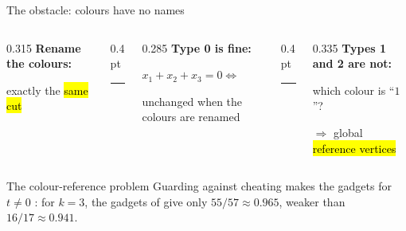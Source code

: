 \begin{frame}{The obstacle: colours have no names}
\vspace{3mm}
\begin{columns}[T,onlytextwidth]
\begin{column}{0.315\textwidth}
\textbf{Rename the colours:}\par\vspace{3.4mm}
\centerline{}\par\vspace{2.6mm}
\centerline{exactly the \hl{same cut}}
\end{column}
\begin{column}{0.4pt}\color{acc!25}\rule{0.4pt}{37mm}\end{column}
\begin{column}{0.285\textwidth}
\textbf{Type 0 is fine:}\par\vspace{2.4mm}
$x_1+x_2+x_3=0$\quad$\Longleftrightarrow$\par\vspace{3mm}
\hspace*{2mm}\par\vspace{2.6mm}
{\small unchanged when the colours are renamed}
\end{column}
\begin{column}{0.4pt}\color{acc!25}\rule{0.4pt}{37mm}\end{column}
\begin{column}{0.335\textwidth}
\textbf{Types 1 and 2 are not:}\par\vspace{2.4mm}
which colour is ``$1$''?\par\vspace{1.8mm}
$\Rightarrow$ global \hl{reference vertices}\par\vspace{3mm}
\hspace*{4mm}
\end{column}
\end{columns}
\vspace{4.5mm}
\begin{alertblock}{The colour-reference problem}
Guarding against cheating makes the gadgets for $t\neq0$ :
for $k=3$, the gadgets of  give only $55/57\approx0.965$, weaker than
$16/17\approx0.941$.
\end{alertblock}
\end{frame}
